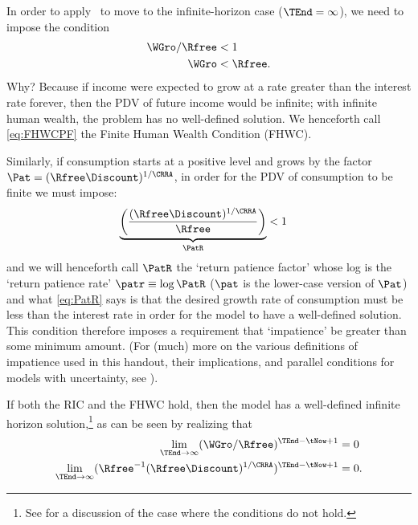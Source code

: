 In order to apply \InfSum~to move to the infinite-horizon case ($\TEnd=\infty$), we need to impose the condition
\begin{equation}\begin{gathered}\begin{aligned}
        {\WGro}/\Rfree & <  1
\\  {\WGro}   & <  \Rfree.  \label{eq:FHWCPF}
\end{aligned}\end{gathered}\end{equation}
Why?  Because if income were expected to grow at a rate
greater than the interest rate forever, then the PDV of future income
would be infinite; with infinite human wealth, the problem has no
well-defined solution.  We henceforth call \eqref{eq:FHWCPF} the
Finite Human Wealth Condition (FHWC).

Similarly, if consumption starts at a positive level and grows by the factor $\Pat=(\Rfree \Discount)^{1/\CRRA}$, in order for the PDV of consumption to be finite we must impose:
\begin{equation}\begin{gathered}\begin{aligned}
        \underbrace{\left(\frac{(\Rfree\Discount)^{1/\CRRA}}{\Rfree}\right)}_{\PatR} & < 1  \label{eq:PatR}
\end{aligned}\end{gathered}\end{equation}
and we will henceforth call $\PatR$ the `return patience factor'
whose log is the `return patience rate' $\patr \equiv \log \PatR$ ($\pat$ is the lower-case version of $\Pat$) and
what \eqref{eq:PatR} says is that the desired growth rate of
consumption must be less than the interest rate in order for the model
to have a well-defined solution.  This condition therefore
imposes a requirement that `impatience' be greater than some minimum amount.
(For (much) more on the various definitions of impatience used in this handout, their implications, and parallel conditions for models with uncertainty, see \cite{BufferStockTheory}).

If both the RIC and the FHWC hold, then the model has a well-defined
infinite horizon solution,\footnote{See \cite{BufferStockTheory} for a discussion of the case where the conditions do not hold.} as can be seen by realizing that
\begin{equation}\begin{gathered}\begin{aligned}
   \lim_{\TEnd \rightarrow \infty} ({\WGro}/\Rfree)^{\TEnd-\tNow+1} & =  0
\\ \lim_{\TEnd \rightarrow \infty} (\Rfree^{-1}(\Rfree\Discount)^{1/\CRRA})^{\TEnd-\tNow+1} & = 0
.
\end{aligned}\end{gathered}\end{equation}


